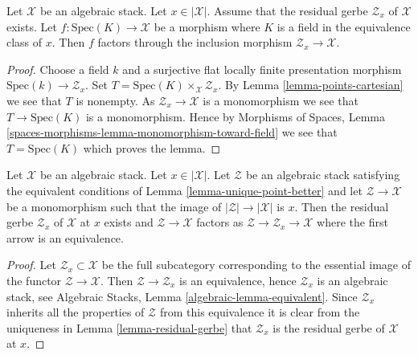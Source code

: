 \begin{lemma}
\label{lemma-residual-gerbe-points}
Let $\mathcal{X}$ be an algebraic stack. Let $x \in |\mathcal{X}|$.
Assume that the residual gerbe $\mathcal{Z}_x$ of $\mathcal{X}$ exists.
Let $f : \text{Spec}(K) \to \mathcal{X}$ be a morphism where $K$ is a field
in the equivalence class of $x$. Then $f$ factors through the inclusion
morphism $\mathcal{Z}_x \to \mathcal{X}$.
\end{lemma}

\begin{proof}
Choose a field $k$ and a surjective flat locally finite presentation
morphism $\text{Spec}(k) \to \mathcal{Z}_x$. Set
$T = \text{Spec}(K) \times_\mathcal{X} \mathcal{Z}_x$. By
Lemma \ref{lemma-points-cartesian}
we see that $T$ is nonempty. As $\mathcal{Z}_x \to \mathcal{X}$
is a monomorphism we see that $T \to \text{Spec}(K)$ is a monomorphism.
Hence by
Morphisms of Spaces, Lemma
\ref{spaces-morphisms-lemma-monomorphism-toward-field}
we see that $T = \text{Spec}(K)$ which proves the lemma.
\end{proof}

\begin{lemma}
\label{lemma-residual-gerbe-unique}
Let $\mathcal{X}$ be an algebraic stack. Let $x \in |\mathcal{X}|$.
Let $\mathcal{Z}$ be an algebraic stack satisfying the equivalent conditions of
Lemma \ref{lemma-unique-point-better}
and let $\mathcal{Z} \to \mathcal{X}$ be a monomorphism such that the image
of $|\mathcal{Z}| \to |\mathcal{X}|$ is $x$. Then the residual gerbe
$\mathcal{Z}_x$ of $\mathcal{X}$ at $x$ exists and
$\mathcal{Z} \to \mathcal{X}$ factors as
$\mathcal{Z} \to \mathcal{Z}_x \to \mathcal{X}$ where the first arrow
is an equivalence.
\end{lemma}

\begin{proof}
Let $\mathcal{Z}_x \subset \mathcal{X}$ be the full subcategory corresponding
to the essential image of the functor $\mathcal{Z} \to \mathcal{X}$.
Then $\mathcal{Z} \to \mathcal{Z}_x$ is an equivalence, hence
$\mathcal{Z}_x$ is an algebraic stack, see
Algebraic Stacks, Lemma \ref{algebraic-lemma-equivalent}.
Since $\mathcal{Z}_x$ inherits all the properties of $\mathcal{Z}$ from
this equivalence it is clear from the uniqueness in
Lemma \ref{lemma-residual-gerbe}
that $\mathcal{Z}_x$ is the residual gerbe of $\mathcal{X}$ at $x$.
\end{proof}











